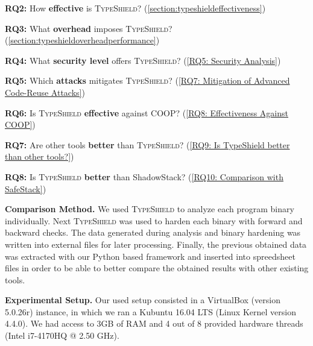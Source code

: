\hspace{-.27cm}
\textbf{RQ2:} How \textbf{effective} is \textsc{TypeShield}? (\cref{section:typeshieldeffectiveness})

\hspace{-.27cm}
\textbf{RQ3:} What \textbf{overhead} imposes \textsc{TypeShield}? (\cref{section:typeshieldoverheadperformance})

\hspace{-.27cm}
\textbf{RQ4:} What \textbf{security level} offers \textsc{TypeShield}? (\cref{RQ5: Security Analysis})


\hspace{-.27cm}
\textbf{RQ5:} Which \textbf{attacks} mitigates \textsc{TypeShield}? (\cref{RQ7: Mitigation of Advanced Code-Reuse Attacks})

\hspace{-.27cm}
\textbf{RQ6:} Is \textsc{TypeShield} \textbf{effective} against COOP? (\cref{RQ8: Effectiveness Against COOP})

\hspace{-.27cm}
\textbf{RQ7:} Are other tools \textbf{better} than \textsc{TypeShield}? (\cref{RQ9: Is TypeShield better than other tools?})

\hspace{-.27cm}
\textbf{RQ8:} Is \textsc{TypeShield} \textbf{better} than ShadowStack? (\cref{RQ10: Comparison with SafeStack})


\textbf{Comparison Method.} We used \textsc{TypeShield} to analyze each program binary individually. Next \textsc{TypeShield} was used to harden each binary with forward and 
backward checks. The data generated during analysis and binary hardening was written into external files for later processing. Finally, the previous obtained 
data was extracted with our Python based framework and inserted into spreedsheet files in order to be able to better compare the obtained 
results with other existing tools.

\textbf{Experimental Setup.} Our used setup consisted in a VirtualBox (version 5.0.26r) instance, in which we ran a Kubuntu 16.04 LTS (Linux Kernel
version 4.4.0). We had access to 3GB of RAM and 4 out of 8 provided hardware threads (Intel i7-4170HQ @ 2.50 GHz).

